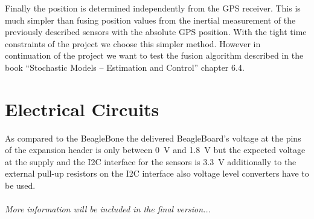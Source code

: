 Finally the position is determined independently from the GPS receiver.
This is much simpler than fusing position values from the inertial measurement of the previously described sensors with the absolute GPS position.
With the tight time constraints of the project we choose this simpler method.
However in continuation of the project we want to test the fusion algorithm described in the book ``Stochastic Models -- Estimation and Control'' chapter 6.4.


\FloatBarrier
\section{Electrical Circuits}

As compared to the BeagleBone the delivered BeagleBoard's voltage at the pins
of the expansion header is only between 0~V and 1.8~V but the expected voltage
at the supply and the I2C interface for the sensors is 3.3~V additionally to
the external pull-up resistors on the I2C interface also voltage level
converters have to be used.
\\
\\
\textit{More information will be included in the final version...}